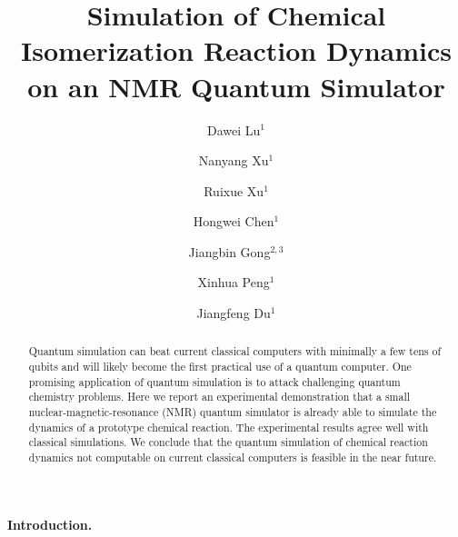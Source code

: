 \documentclass[twocolumn,showpacs,twoside,10pt,prl]{revtex4}
\begin{document}
\title{Simulation of Chemical Isomerization Reaction Dynamics on an NMR Quantum Simulator}
\author{Dawei Lu$^{1}$}
\author{Nanyang Xu$^{1}$}
\author{Ruixue Xu$^{1}$}
\author{Hongwei Chen$^{1}$}
\author{Jiangbin Gong$^{2,3}$}
\author{Xinhua Peng$^{1}$}
\author{Jiangfeng Du$^{1}$}




\begin{abstract}




Quantum simulation can beat current classical computers with minimally a few tens of qubits and will likely
become the first practical use of a quantum computer. One promising application of quantum simulation is to attack
challenging quantum chemistry problems.  Here we report an experimental demonstration that a small
nuclear-magnetic-resonance (NMR) quantum simulator is already able to
simulate the dynamics of a prototype chemical reaction.
The experimental results agree well with classical simulations.
We conclude that the quantum simulation of chemical reaction dynamics not computable on current classical computers is feasible in the near future.







\end{abstract}

\maketitle



\paragraph*{Introduction.}
\end{document}
